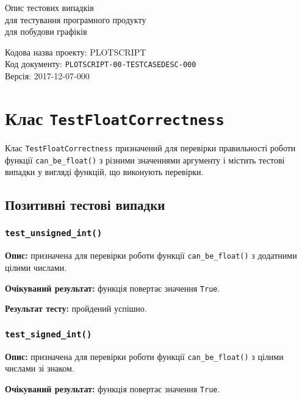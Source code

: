 \documentclass[a4paper,oneside,DIV=12,12pt]{scrartcl}
\newcommand{\theprojcode}{PLOTSCRIPT}
\newcommand{\theprojrev}{00}
\newcommand{\thedoctype}{TESTCASEDESC}
\newcommand{\thedocnum}{000}
\newcommand{\thedocfullcode}{\theprojcode-\theprojrev-\thedoctype-\thedocnum}
\newcommand{\printdocfullcode}{\texttt{\thedocfullcode}}
\newcommand{\theversion}{2017-12-07-000}
\newcommand{\classname}[1]{\texttt{#1}}
\newcommand{\funcname}[1]{\texttt{#1}}
\newcommand{\caseattrib}[1]{\noindent\textbf{#1}}
\newcommand{\printtrue}{\texttt{True}}
\begin{document}
	\begin{titlepage}
	\begin{center}
		\vspace*{\fill}
			Опис тестових випадків\\
			для тестування програмного продукту\\
			для побудови графіків
			
		\vspace*{\fill}
	\end{center}
	Кодова назва проекту: \theprojcode\\
	Код документу: \printdocfullcode\\
	Версія: \theversion\\
	\end{titlepage}
	
	\tableofcontents
	\newpage
	
	\section{Клас \classname{TestFloatCorrectness}}
		Клас \classname{TestFloatCorrectness} призначений для перевірки правильності роботи функції \verb|can_be_float()| з різними значеннями аргументу і містить тестові випадки у вигляді функцій, що виконують перевірки.
		
		\subsection{Позитивні тестові випадки}
		
			\subsubsection{\funcname{test\_unsigned\_int()}}
				\caseattrib{Опис:} призначена для перевірки роботи функції \verb|can_be_float()| з додатними цілими числами.
				
				\caseattrib{Очікуваний результат:} функція повертає значення \printtrue.
				
				\caseattrib{Результат тесту:} пройдений успішно.
				
			\subsubsection{\funcname{test\_signed\_int()}}
				\caseattrib{Опис:} призначена для перевірки роботи функції \verb|can_be_float()| з цілими числами зі знаком.
				
				\caseattrib{Очікуваний результат:} функція повертає значення \printtrue.
				
\end{document}
